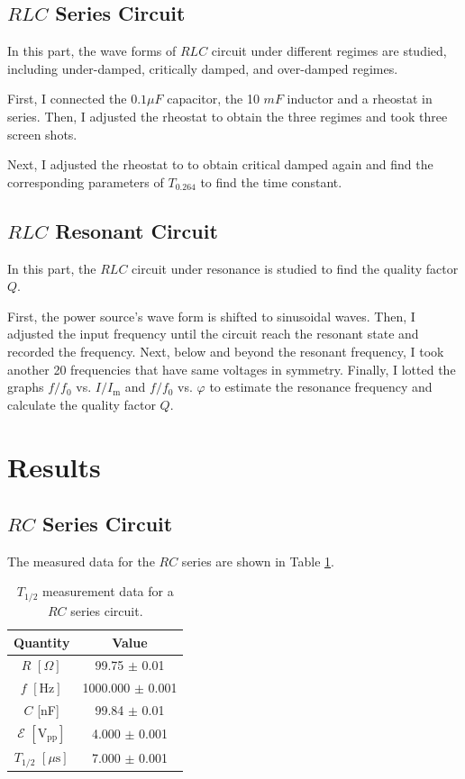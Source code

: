 \documentclass{article}
\begin{document}
\subsection{$RLC$ Series Circuit}

In this part, the wave forms of $RLC$ circuit under different regimes are studied, including under-damped, critically damped, and over-damped regimes.

First, I connected the $0.1\mu F$ capacitor, the 10 $mF$ inductor and a rheostat in series. Then, I adjusted the rheostat to obtain the three regimes and took three screen shots. 

Next, I adjusted the rheostat to to obtain critical damped again and find the corresponding parameters of $T_{0.264}$ to find the time constant.


\subsection{$RLC$ Resonant Circuit}

In this part, the $RLC$ circuit under resonance is studied to find the quality factor $Q$.

First, the power source's wave form is shifted to sinusoidal waves. Then, I adjusted the input frequency until the circuit reach the resonant state and recorded the frequency. Next, below and beyond the resonant frequency, I took another 20 frequencies that have same voltages in symmetry. Finally, I lotted the graphs $f/f_0$ vs. $I/I_\text{m}$ and $f/f_0$ vs. $\varphi$ to estimate the resonance frequency and calculate the quality factor $Q$.


\section{Results}

\subsection{$RC$ Series Circuit}

The measured data for the $RC$ series are shown in Table \ref{TableRC}.

\begin{table}[H]
    \centering
    \begin{tabular}{c|c}
        \toprule
        Quantity & Value \\
        \midrule
        $R\,\,[\Omega]$ & 99.75 $\pm$ 0.01 \\
        $f\,\,[\text{Hz}]$ & 1000.000 $\pm$ 0.001 \\
        $C$ [nF] & 99.84 $\pm$ 0.01 \\
        $\mathcal{E}\,\,[\text{V}_{\text{pp}}]$ & 4.000 $\pm$ 0.001    \\
        $T_{1/2}\,\,[\mu\text{s}]$  & 7.000 $\pm$ 0.001  \\
        \bottomrule
    \end{tabular}
    \caption{$T_{1/2}$ measurement data for a $RC$ series circuit.\label{TableRC}}
\end{table}
\end{document}
